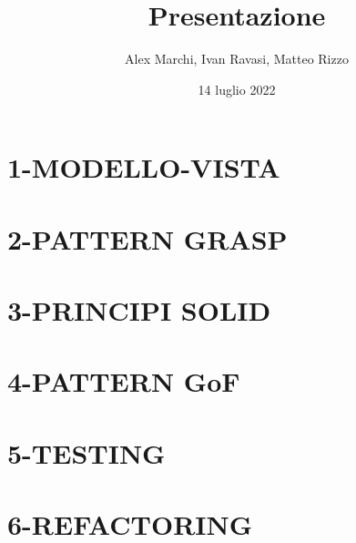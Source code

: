 \documentclass{beamer}
\begin{document}
    \title{Presentazione}
    \author{Alex Marchi, Ivan Ravasi, Matteo Rizzo}
    \date{14 luglio 2022}

    \frame{\titlepage}


    \section{1-MODELLO-VISTA}
    

    \section{2-PATTERN GRASP}
    

    \section{3-PRINCIPI SOLID}
    

    \section{4-PATTERN GoF}
    

    \section{5-TESTING}
    

    \section{6-REFACTORING}
    
\end{document}
